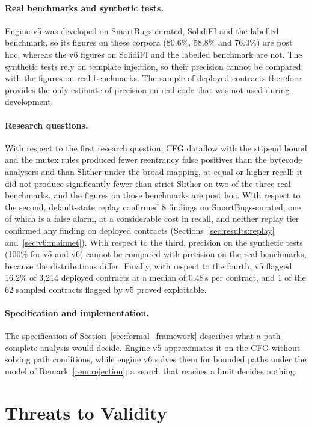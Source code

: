 \documentclass[pdflatex,sn-mathphys]{sn-jnl}
\theoremstyle{thmstyletwo}
\theoremstyle{thmstyletwo}
\begin{document}
\paragraph{Real benchmarks and synthetic tests.} Engine v5 was developed on SmartBugs-curated, SolidiFI and the labelled benchmark, so its figures on these corpora (80.6\%, 58.8\% and 76.0\%) are post hoc, whereas the v6 figures on SolidiFI and the labelled benchmark are not. The synthetic tests rely on template injection, so their precision cannot be compared with the figures on real benchmarks. The sample of deployed contracts therefore provides the only estimate of precision on real code that was not used during development.

\paragraph{Research questions.} With respect to the first research question, CFG dataflow with the stipend bound and the mutex rules produced fewer reentrancy false positives than the bytecode analysers and than Slither under the broad mapping, at equal or higher recall; it did not produce significantly fewer than strict Slither on two of the three real benchmarks, and the figures on those benchmarks are post hoc. With respect to the second, default-state replay confirmed 8 findings on SmartBugs-curated, one of which is a false alarm, at a considerable cost in recall, and neither replay tier confirmed any finding on deployed contracts (Sections~\ref{sec:results:replay} and~\ref{sec:v6:mainnet}). With respect to the third, precision on the synthetic tests (100\% for v5 and v6) cannot be compared with precision on the real benchmarks, because the distributions differ. Finally, with respect to the fourth, v5 flagged 16.2\% of 3,214 deployed contracts at a median of 0.48\,s per contract, and 1 of the 62 sampled contracts flagged by v5 proved exploitable.

\paragraph{Specification and implementation.} The specification of Section~\ref{sec:formal_framework} describes what a path-complete analysis would decide. Engine v5 approximates it on the CFG without solving path conditions, while engine v6 solves them for bounded paths under the model of Remark~\ref{rem:rejection}; a search that reaches a limit decides nothing.

\section{Threats to Validity}\label{sec:threats}
\end{document}
